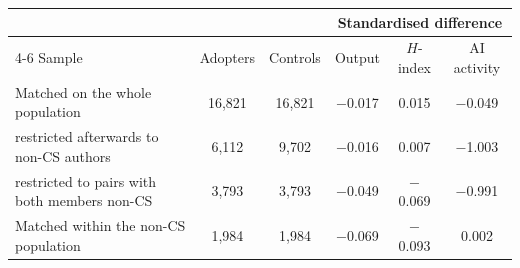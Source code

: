 \begin{tabular}{lccccc}
\toprule
 & & & \multicolumn{3}{c}{Standardised difference} \\
\cmidrule(lr){4-6}
Sample & Adopters & Controls & Output & $H$-index & AI activity \\
\midrule
Matched on the whole population & 16,821 & 16,821 & $-$0.017 & 0.015 & $-$0.049 \\
\;\;restricted afterwards to non-CS authors & 6,112 & 9,702 & $-$0.016 & 0.007 & $-$1.003 \\
\;\;restricted to pairs with both members non-CS & 3,793 & 3,793 & $-$0.049 & $-$0.069 & $-$0.991 \\
\addlinespace
Matched within the non-CS population & 1,984 & 1,984 & $-$0.069 & $-$0.093 & 0.002 \\
\bottomrule
\end{tabular}
